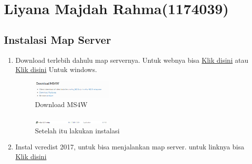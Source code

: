 \section{Liyana Majdah Rahma(1174039)}
\subsection{Instalasi Map Server}
\begin{enumerate}
    \item Download terlebih dahulu map servernya. Untuk webnya bisa \href{https://mapserver.org/}{Klik disini} atau \href{https://ms4w.com/}{Klik disini} Untuk windows.
    \hfill\break
    \begin{figure}[H]
		\includegraphics[width=4cm]{figures/1174039/tugas4/1.png}
		\centering
		\caption{Download MS4W}
    \end{figure}
    \hfill\break
    \begin{figure}[H]
		\includegraphics[width=4cm]{figures/1174039/tugas4/2.png}
		\centering
		\caption{Setelah itu lakukan instalasi}
   
    \end{figure}
    \item Instal vcredist 2017, untuk bisa menjalankan map server. untuk linknya bisa \href{https://support.microsoft.com/id-id/help/2977003/the-latest-supported-visual-c-downloads}{Klik disini}
\end{enumerate}

